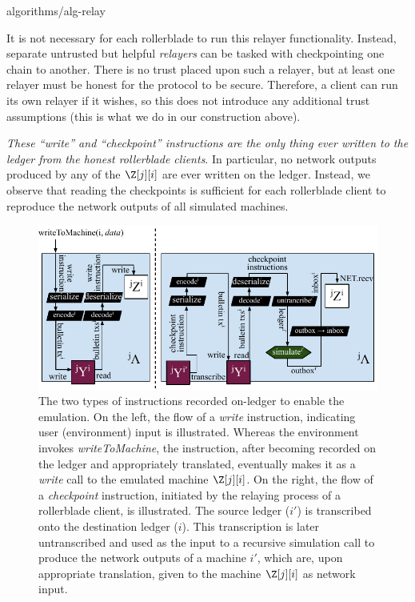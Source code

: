{algorithms/alg-relay}

It is not necessary for each rollerblade to run this relayer functionality. Instead,
separate untrusted but helpful \emph{relayers} can be tasked with checkpointing one
chain to another. There is no trust placed upon such a relayer, but at least one relayer
must be honest for the protocol to be secure. Therefore, a \rollerblade client can run its
own relayer if it wishes, so this does not introduce any additional trust assumptions
(this is what we do in our construction above).

\emph{These ``write'' and ``checkpoint'' instructions are the only thing ever written
to the ledger from the honest rollerblade clients}. In particular, no network outputs
produced by any of the $\Z[j][i]$ are ever written on the ledger. Instead, we observe
that reading the checkpoints is sufficient for each rollerblade client to reproduce
the network outputs of all simulated machines.

\begin{figure}
  \centering
  \includegraphics[width=\textwidth,keepaspectratio]{figures/rollerblade-instructions.pdf}
  \caption{The two types of instructions recorded on-ledger to enable the emulation.
           On the left, the flow of a \emph{write} instruction, indicating user (environment)
           input is illustrated. Whereas the environment invokes \emph{writeToMachine}, the
           instruction, after becoming recorded on the ledger and appropriately translated,
           eventually makes it as a \emph{write} call to the emulated machine $\Z[j][i]$.
           On the right, the flow of a \emph{checkpoint} instruction, initiated by the relaying
           process of a rollerblade client, is illustrated. The source ledger ($i'$) is
           transcribed onto the destination ledger ($i$). This transcription is later
           untranscribed and used as the input to a recursive simulation call to produce
           the network outputs of a machine $i'$, which are, upon appropriate translation,
           given to the machine $\Z[j][i]$ as network input.}
  \label{fig.rollerblade-instructions}
\end{figure}

